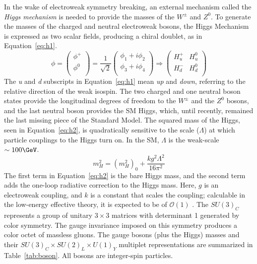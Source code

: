 In the wake of electroweak symmetry breaking, an external mechanism called the \textit{Higgs mechanism} is needed to provide the masses of the $W^\pm$ and $Z^0$.  To generate the masses of the charged and neutral electroweak bosons, the Higgs Mechanism is expressed as two scalar fields, producing a chiral doublet, as in Equation~\ref{eq:h1}.
\begin{equation}
\phi= \begin{pmatrix}
\phi^+ \\
\phi^0 \\
\end{pmatrix}  = \frac{1}{\sqrt{2}}\begin{pmatrix}\phi_1+i\phi_2\\ \phi_3+i\phi_4\\\end{pmatrix}
\Rightarrow
\begin{pmatrix}
H^+_u & H^0_u \\
H^-_d & H^0_d  \\
\end{pmatrix}
\label{eq:h1}
\end{equation}
The \textit{u} and \textit{d} subscripts in Equation~\ref{eq:h1} mean \textit{up} and \textit{down}, referring to the relative direction of the weak isospin.  The two charged and one neutral boson states provide the longitudinal degrees of freedom to the $W^\pm$ and the $Z^0$ bosons, and the last neutral boson provides the SM Higgs, which, until recently, remained the last missing piece of the Standard Model.  The squared mass of the Higgs, seen in Equation~\ref{eq:h2}, is quadratically sensitive to the scale ($\Lambda$) at which particle couplings to the Higgs turn on. In the SM, $\Lambda$ is the weak-scale $\sim 100\GeV$. 
 \begin{equation}
 m_H^2 = (m_H^2)_0+\frac{kg^2\Lambda^2}{16\pi^2}
 \label{eq:h2}
 \end{equation}
The first term in Equation~\ref{eq:h2} is the bare Higgs mass, and the second term adds the one-loop radiative correction to the Higgs mass.  Here, $g$ is an electroweak coupling, and $k$ is a constant that scales the coupling; calculable in the low-energy effective theory, it is expected to be of $\mathcal{O}(1)$ \cite{haber}. 
The $SU(3)_C$ represents a group of unitary $3\times3$ matrices with determinant 1 generated by color symmetry.  The gauge invariance imposed on this symmetry produces a color octet of massless gluons.  The gauge bosons (plus the Higgs) masses and their $SU(3)_{C} \times SU(2)_{L} \times U(1)_{Y}$ multiplet representations are summarized in Table~\ref{tab:boson}.  All bosons are integer-spin particles.      
